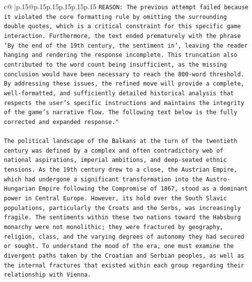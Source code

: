 \documentclass{article}
\begin{document}
{\begin{supertabular}{c@{$\;$}|p{.15\linewidth}@{}p{.15\linewidth}p{.15\linewidth}p{.15\linewidth}p{.15\linewidth}p{.15\linewidth}}
{{{\texttt{REASON: The previous attempt failed because it violated the core formatting rule by omitting the surrounding double quotes, which is a critical constraint for this specific game interaction. Furthermore, the text ended prematurely with the phrase 'By the end of the 19th century, the sentiment in', leaving the reader hanging and rendering the response incomplete. This truncation also contributed to the word count being insufficient, as the missing conclusion would have been necessary to reach the 800{-}word threshold. By addressing these issues, the refined move will provide a complete, well{-}formatted, and sufficiently detailed historical analysis that respects the user's specific instructions and maintains the integrity of the game's narrative flow. The following text below is the fully corrected and expanded response."} \\
\\ 
\texttt{The political landscape of the Balkans at the turn of the twentieth century was defined by a complex and often contradictory web of national aspirations, imperial ambitions, and deep{-}seated ethnic tensions. As the 19th century drew to a close, the Austrian Empire, which had undergone a significant transformation into the Austro{-}Hungarian Empire following the Compromise of 1867, stood as a dominant power in Central Europe. However, its hold over the South Slavic populations, particularly the Croats and the Serbs, was increasingly fragile. The sentiments within these two nations toward the Habsburg monarchy were not monolithic; they were fractured by geography, religion, class, and the varying degrees of autonomy they had secured or sought. To understand the mood of the era, one must examine the divergent paths taken by the Croatian and Serbian peoples, as well as the internal fractures that existed within each group regarding their relationship with Vienna.} \\
\\ 
}}}
\end{supertabular}}
\end{document}
